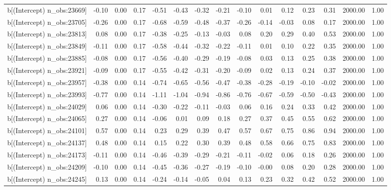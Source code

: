 \begin{table}[ht]
\begin{tabular}{rrrrrrrrrrrrrrr}
  b[(Intercept) n\_obs:23669] & -0.10 & 0.00 & 0.17 & -0.51 & -0.43 & -0.32 & -0.21 & -0.10 & 0.01 & 0.12 & 0.23 & 0.31 & 2000.00 & 1.00 \\ 
  b[(Intercept) n\_obs:23705] & -0.26 & 0.00 & 0.17 & -0.68 & -0.59 & -0.48 & -0.37 & -0.26 & -0.14 & -0.03 & 0.08 & 0.17 & 2000.00 & 1.00 \\ 
  b[(Intercept) n\_obs:23813] & 0.08 & 0.00 & 0.17 & -0.38 & -0.25 & -0.13 & -0.03 & 0.08 & 0.20 & 0.29 & 0.40 & 0.53 & 2000.00 & 1.00 \\ 
  b[(Intercept) n\_obs:23849] & -0.11 & 0.00 & 0.17 & -0.58 & -0.44 & -0.32 & -0.22 & -0.11 & 0.01 & 0.10 & 0.22 & 0.35 & 2000.00 & 1.00 \\ 
  b[(Intercept) n\_obs:23885] & -0.08 & 0.00 & 0.17 & -0.56 & -0.40 & -0.29 & -0.19 & -0.08 & 0.03 & 0.13 & 0.25 & 0.38 & 2000.00 & 1.00 \\ 
  b[(Intercept) n\_obs:23921] & -0.09 & 0.00 & 0.17 & -0.55 & -0.42 & -0.31 & -0.20 & -0.09 & 0.02 & 0.13 & 0.24 & 0.37 & 2000.00 & 1.00 \\ 
  b[(Intercept) n\_obs:23957] & -0.38 & 0.00 & 0.14 & -0.74 & -0.65 & -0.56 & -0.47 & -0.38 & -0.28 & -0.19 & -0.10 & -0.02 & 2000.00 & 1.00 \\ 
  b[(Intercept) n\_obs:23993] & -0.77 & 0.00 & 0.14 & -1.11 & -1.04 & -0.94 & -0.86 & -0.76 & -0.67 & -0.59 & -0.50 & -0.43 & 2000.00 & 1.00 \\ 
  b[(Intercept) n\_obs:24029] & 0.06 & 0.00 & 0.14 & -0.30 & -0.22 & -0.11 & -0.03 & 0.06 & 0.16 & 0.24 & 0.33 & 0.42 & 2000.00 & 1.00 \\ 
  b[(Intercept) n\_obs:24065] & 0.27 & 0.00 & 0.14 & -0.06 & 0.01 & 0.09 & 0.18 & 0.27 & 0.37 & 0.45 & 0.55 & 0.62 & 2000.00 & 1.00 \\ 
  b[(Intercept) n\_obs:24101] & 0.57 & 0.00 & 0.14 & 0.23 & 0.29 & 0.39 & 0.47 & 0.57 & 0.67 & 0.75 & 0.86 & 0.94 & 2000.00 & 1.00 \\ 
  b[(Intercept) n\_obs:24137] & 0.48 & 0.00 & 0.14 & 0.15 & 0.22 & 0.30 & 0.39 & 0.48 & 0.58 & 0.66 & 0.75 & 0.83 & 2000.00 & 1.00 \\ 
  b[(Intercept) n\_obs:24173] & -0.11 & 0.00 & 0.14 & -0.46 & -0.39 & -0.29 & -0.21 & -0.11 & -0.02 & 0.06 & 0.18 & 0.26 & 2000.00 & 1.00 \\ 
  b[(Intercept) n\_obs:24209] & -0.10 & 0.00 & 0.14 & -0.45 & -0.36 & -0.27 & -0.19 & -0.10 & -0.00 & 0.08 & 0.20 & 0.28 & 2000.00 & 1.00 \\ 
  b[(Intercept) n\_obs:24245] & 0.13 & 0.00 & 0.14 & -0.24 & -0.14 & -0.05 & 0.04 & 0.13 & 0.23 & 0.32 & 0.42 & 0.52 & 2000.00 & 1.00 \\ 

\end{tabular}
\end{table}
